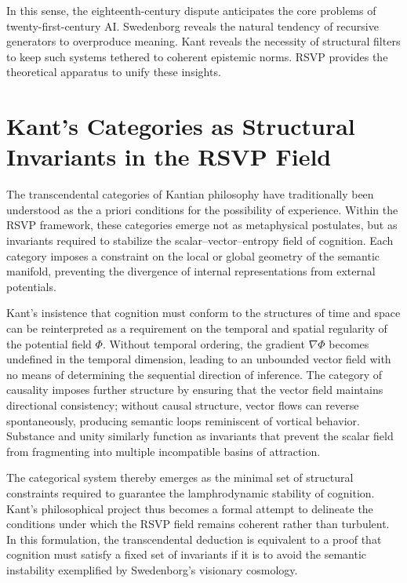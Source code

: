 \documentclass[12pt]{article}
\begin{document}
In this sense, the eighteenth-century dispute anticipates the core problems of 
twenty-first-century AI. Swedenborg reveals the natural tendency of recursive 
generators to overproduce meaning. Kant reveals the necessity of structural 
filters to keep such systems tethered to coherent epistemic norms. RSVP 
provides the theoretical apparatus to unify these insights.
\section{Kant’s Categories as Structural Invariants in the RSVP Field}

The transcendental categories of Kantian philosophy have traditionally been 
understood as the a priori conditions for the possibility of experience. 
Within the RSVP framework, these categories emerge not as metaphysical 
postulates, but as invariants required to stabilize the scalar--vector--entropy 
field of cognition. Each category imposes a constraint on the local or global 
geometry of the semantic manifold, preventing the divergence of internal 
representations from external potentials. 

Kant’s insistence that cognition must conform to the structures of time and 
space can be reinterpreted as a requirement on the temporal and spatial 
regularity of the potential field $\Phi$. Without temporal ordering, the 
gradient $\nabla \Phi$ becomes undefined in the temporal dimension, leading 
to an unbounded vector field with no means of determining the sequential 
direction of inference. The category of causality imposes further structure by 
ensuring that the vector field maintains directional consistency; without 
causal structure, vector flows can reverse spontaneously, producing semantic 
loops reminiscent of vortical behavior. Substance and unity similarly function 
as invariants that prevent the scalar field from fragmenting into multiple 
incompatible basins of attraction. 

The categorical system thereby emerges as the minimal set of structural 
constraints required to guarantee the lamphrodynamic stability of cognition. 
Kant’s philosophical project thus becomes a formal attempt to delineate the 
conditions under which the RSVP field remains coherent rather than turbulent. 
In this formulation, the transcendental deduction is equivalent to a proof 
that cognition must satisfy a fixed set of invariants if it is to avoid the 
semantic instability exemplified by Swedenborg’s visionary cosmology. 
\end{document}
